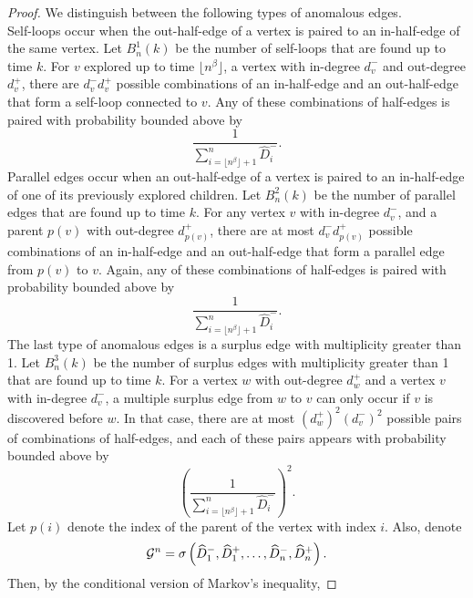 \begin{proof}
We distinguish between the following types of anomalous edges.\\
Self-loops occur when the out-half-edge of a vertex is paired to an in-half-edge of the same vertex.  Let $B^1_n(k)$ be the number of self-loops that are found up to time $k$. For $v$ explored up to time $\lfloor n^\beta\rfloor$, a vertex with in-degree $d^-_v$ and out-degree $d^+_v$, there are $d^-_v d^+_v$ possible combinations of an in-half-edge and an out-half-edge that form a self-loop connected to $v$. Any of these combinations of half-edges is paired with probability bounded above by 
$$\frac{1}{\sum_{i=\lfloor n^\beta \rfloor+1}^n\widehat{D}^-_i}.$$
Parallel edges occur when an out-half-edge of a vertex is paired to an in-half-edge of one of its previously explored children. Let $B^2_n(k)$ be the number of parallel edges that are found up to time $k$. For any vertex $v$ with in-degree $d^-_v$, and a parent $p(v)$ with out-degree $d^+_{p(v)}$, there are at most $d^-_v d^+_{p(v)}$ possible combinations of an in-half-edge and an out-half-edge that form a parallel edge from $p(v)$ to $v$. Again, any of these combinations of half-edges is paired with probability bounded above by 
$$\frac{1}{\sum_{i=\lfloor n^\beta \rfloor+1}^n \widehat{D}^-_i}.$$
The last type of anomalous edges is a surplus edge with multiplicity greater than 1. Let $B^3_n(k)$ be the number of surplus edges with multiplicity greater than 1 that are found up to time $k$. For a vertex $w$ with out-degree $d^+_w$ and a vertex $v$ with in-degree $d^-_v$, a multiple surplus edge from $w$ to $v$ can only occur if $v$ is discovered before $w$. In that case, there are at most $(d^+_w)^2(d^-_v)^2$ possible pairs of combinations of half-edges, and each of these pairs appears with probability bounded above by
$$\left(\frac{1}{\sum_{i=\lfloor n^\beta \rfloor+1}^n \widehat{D}^-_i}\right)^2.$$
Let $p(i)$ denote the index of the parent of the vertex with index $i$. Also, denote $${\mathcal G}^n=\sigma\left(\widehat{D}^-_1,\widehat{D}^+_1,\dots,\widehat{D}^-_n,\widehat{D}^+_n \right).$$ Then, by the conditional version of Markov's inequality, 


\end{proof}
